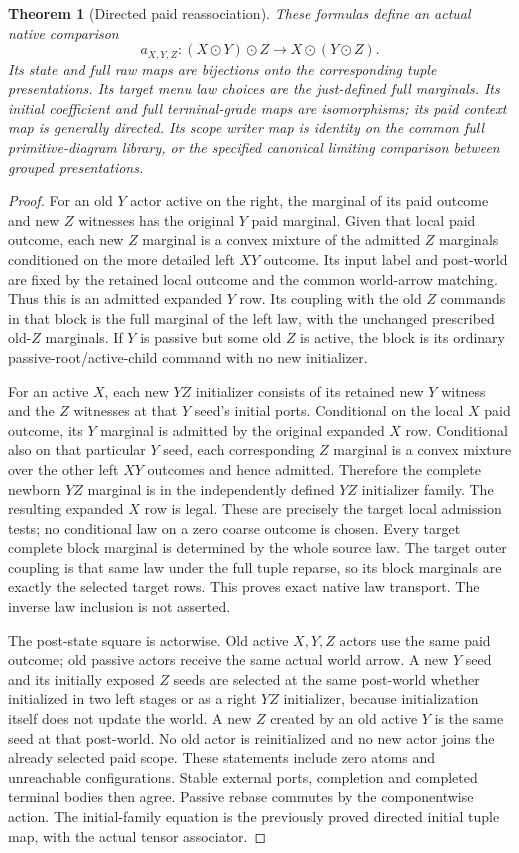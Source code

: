\documentclass[11pt]{article}
\newtheorem{theorem}{Theorem}\newtheorem{definition}[theorem]{Definition}
\begin{document}
\begin{theorem}[Directed paid reassociation]
These formulas define an actual native comparison
\[
 a_{X,Y,Z}:(X\odot Y)\odot Z\longrightarrow X\odot(Y\odot Z).
\]
Its state and full raw maps are bijections onto the corresponding tuple presentations. Its target menu law choices are the just-defined full marginals. Its initial coefficient and full terminal-grade maps are isomorphisms; its paid context map is generally directed. Its scope writer map is identity on the common full primitive-diagram library, or the specified canonical limiting comparison between grouped presentations.
\end{theorem}
\begin{proof}
For an old $Y$ actor active on the right, the marginal of its paid outcome and new $Z$ witnesses has the original $Y$ paid marginal. Given that local paid outcome, each new $Z$ marginal is a convex mixture of the admitted $Z$ marginals conditioned on the more detailed left $XY$ outcome. Its input label and post-world are fixed by the retained local outcome and the common world-arrow matching. Thus this is an admitted expanded $Y$ row. Its coupling with the old $Z$ commands in that block is the full marginal of the left law, with the unchanged prescribed old-$Z$ marginals. If $Y$ is passive but some old $Z$ is active, the block is its ordinary passive-root/active-child command with no new initializer.

For an active $X$, each new $YZ$ initializer consists of its retained new $Y$ witness and the $Z$ witnesses at that $Y$ seed's initial ports. Conditional on the local $X$ paid outcome, its $Y$ marginal is admitted by the original expanded $X$ row. Conditional also on that particular $Y$ seed, each corresponding $Z$ marginal is a convex mixture over the other left $XY$ outcomes and hence admitted. Therefore the complete newborn $YZ$ marginal is in the independently defined $YZ$ initializer family. The resulting expanded $X$ row is legal. These are precisely the target local admission tests; no conditional law on a zero coarse outcome is chosen. Every target complete block marginal is determined by the whole source law. The target outer coupling is that same law under the full tuple reparse, so its block marginals are exactly the selected target rows. This proves exact native law transport. The inverse law inclusion is not asserted.

The post-state square is actorwise. Old active $X,Y,Z$ actors use the same paid outcome; old passive actors receive the same actual world arrow. A new $Y$ seed and its initially exposed $Z$ seeds are selected at the same post-world whether initialized in two left stages or as a right $YZ$ initializer, because initialization itself does not update the world. A new $Z$ created by an old active $Y$ is the same seed at that post-world. No old actor is reinitialized and no new actor joins the already selected paid scope. These statements include zero atoms and unreachable configurations. Stable external ports, completion and completed terminal bodies then agree. Passive rebase commutes by the componentwise action. The initial-family equation is the previously proved directed initial tuple map, with the actual tensor associator.


\end{proof}
\end{document}
